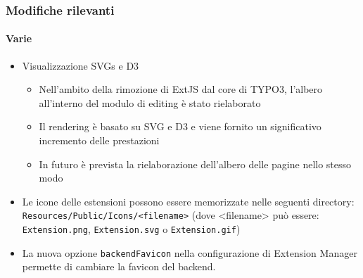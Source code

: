 \begin{frame}[fragile]
	\frametitle{Modifiche rilevanti}
	\framesubtitle{Varie}

	\begin{itemize}

		\item Visualizzazione SVGs e D3

			\begin{itemize}
				\item Nell'ambito della rimozione di ExtJS dal core di TYPO3, l'albero all'interno del modulo di editing è stato rielaborato
				\item Il rendering è basato su SVG e D3 e viene fornito un significativo incremento delle prestazioni
				\item In futuro è prevista la rielaborazione dell'albero delle pagine nello stesso modo 
			\end{itemize}

		\item Le icone delle estensioni possono essere memorizzate nelle seguenti directory:\newline
			\small
				\texttt{Resources/Public/Icons/<filename>}
				(dove <filename> può essere: \texttt{Extension.png}, \texttt{Extension.svg} o \texttt{Extension.gif})
			\normalsize

		\item La nuova opzione \texttt{backendFavicon} nella configurazione di Extension Manager permette di
			cambiare la favicon del backend.

	\end{itemize}

\end{frame}

